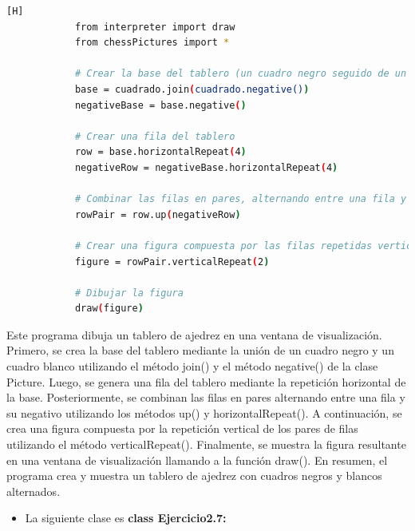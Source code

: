 \documentclass{article}
\begin{document}
	\begin{lstlisting}[language=bash,caption={\textbf{SEXTO EJERCICIO}}][H]
            from interpreter import draw
            from chessPictures import *
            
            # Crear la base del tablero (un cuadro negro seguido de un cuadro blanco)
            base = cuadrado.join(cuadrado.negative())
            negativeBase = base.negative()
            
            # Crear una fila del tablero
            row = base.horizontalRepeat(4)
            negativeRow = negativeBase.horizontalRepeat(4)
            
            # Combinar las filas en pares, alternando entre una fila y su negativo
            rowPair = row.up(negativeRow)
            
            # Crear una figura compuesta por las filas repetidas verticalmente
            figure = rowPair.verticalRepeat(2)
            
            # Dibujar la figura
            draw(figure)
	\end{lstlisting}
Este programa dibuja un tablero de ajedrez en una ventana de visualización. Primero, se crea la base del tablero mediante la unión de un cuadro negro y un cuadro blanco utilizando el método join() y el método negative() de la clase Picture. Luego, se genera una fila del tablero mediante la repetición horizontal de la base. Posteriormente, se combinan las filas en pares alternando entre una fila y su negativo utilizando los métodos up() y horizontalRepeat(). A continuación, se crea una figura compuesta por la repetición vertical de los pares de filas utilizando el método verticalRepeat(). Finalmente, se muestra la figura resultante en una ventana de visualización llamando a la función draw(). En resumen, el programa crea y muestra un tablero de ajedrez con cuadros negros y blancos alternados.

\begin{itemize}	
		\item La siguiente clase es \textbf{class Ejercicio2.7:} 
	\end{itemize}
 
\end{document}
